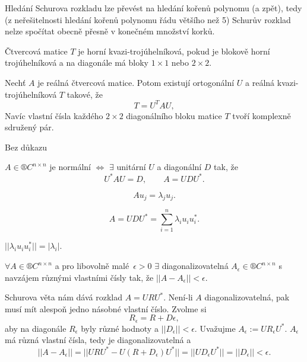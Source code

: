 \documentclass[12pt]{article}					%
\begin{document}
\begin{poznamka}
	Hledání Schurova rozkladu lze převést na hledání kořenů polynomu (a zpět), tedy (z neřešitelnosti hledání kořenů polynomu řádu většího než 5) Schurův rozklad nelze spočítat obecně přesně v konečném množství korků.
\end{poznamka}

\begin{definice}
	Čtvercová matice $T$ je horní kvazi-trojúhelníková, pokud je blokově horní trojúhelníková a na diagonále má bloky $1 \times 1$ nebo $2 \times 2$.
\end{definice}

\begin{veta}
	Nechť $A$ je reálná čtvercová matice. Potom existují ortogonální $U$ a reálná kvazi-trojúhelníková $T$ takové, že
	$$ T = U^TAU, $$
	Navíc vlastní čísla každého $2 \times 2$ diagonálního bloku matice $T$ tvoří komplexně sdružený pár.

	\begin{dukazin}
		Bez důkazu
	\end{dukazin}
\end{veta}

\begin{dusledek}
	$A \in ®C^{n \times n}$ je normální $\Leftrightarrow$ $\exists$ unitární $U$ a diagonální $D$ tak, že
	$$ U^*AU = D, \qquad A = UDU^*. $$
\end{dusledek}

\begin{dusledek}[Důsledku]
	$$ Au_j = \lambda_ju_j. $$
\end{dusledek}

\begin{dusledek}
	$$ A = UDU^* = \sum_{i=1}^n \lambda_i u_i u_i^*. $$

	\begin{poznamkain}
		$||\lambda_i u_i u_i^*|| = |\lambda_i|$.
	\end{poznamkain}
\end{dusledek}

\begin{veta}
	$\forall A \in ®C^{n \times n}$ a pro libovolně malé $\epsilon > 0$ $\exists$ diagonalizovatelná $A_{\epsilon} \in ®C^{n \times n}$ s navzájem různými vlastními čísly tak, že $||A - A_\epsilon|| < \epsilon$.

	\begin{dukazin}
		Schurova věta nám dává rozklad $A = URU^*$. Není-li $A$ diagonalizovatelná, pak musí mít alespoň jedno násobné vlastní číslo. Zvolme si
		$$ R_\epsilon = R + D \epsilon, $$
		aby na diagonále $R_\epsilon$ byly různé hodnoty a $||D_\epsilon|| < \epsilon$. Uvažujme $A_\epsilon := UR_\epsilon U^*$. $A_\epsilon$ má různá vlastní čísla, tedy je diagonalizovatelná a
		$$ ||A - A_\epsilon|| = ||URU^* - U(R + D_\epsilon)U^*|| = ||UD_\epsilon U^*|| = ||D_\epsilon|| < \epsilon. $$
	\end{dukazin}
\end{veta}
\end{document}
